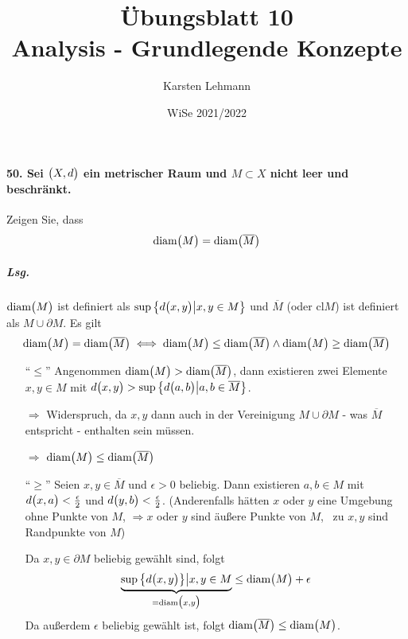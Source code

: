 \documentclass{scrreprt}
\author{Karsten Lehmann}
\date{WiSe 2021/2022}
\title{Übungsblatt 10\\Analysis - Grundlegende Konzepte}
\newcommand\diam{\text{diam}}
\begin{document}
\paragraph{50. Sei $\qty\big(X, d)$ ein metrischer Raum und $M \subset X$
  nicht leer und beschränkt.}
Zeigen Sie, dass
\[
  \diam\qty\big(M) = \diam\qty\big(\overline{M})
\]

\subparagraph{Lsg.} $\diam\qty\big(M)$ ist definiert als
$\sup \qty\big{d\qty\big(x, y) {\big |} x, y \in M}$ und
$\overline{M}$ (oder $\text{cl}M$) ist definiert als $M \cup \partial M$.
Es gilt
\[
  \diam\qty\big(M) = \diam\qty\big(\overline{M}) \iff
  \diam\qty\big(M) \leq \diam\qty\big(\overline{M}) \land
  \diam\qty\big(M) \geq \diam\qty\big(\overline{M})
\]
\begin{itemize}
\item[``$\leq$''] Angenommen $\diam\qty\big(M) > \diam\qty\big(\overline{M})$,
  dann existieren zwei Elemente $x, y \in M$ mit $d\qty\big(x, y) >
  \sup\qty\big{d\qty\big(a, b) {\big |} a, b \in \overline{M}}$.

  $\Rightarrow$ Widerspruch, da $x, y$ dann auch in der Vereinigung
  $M \cup \partial M$ - was $\overline{M}$ entspricht - enthalten sein
  müssen.

  $\Rightarrow$ \underline{$\diam\qty\big(M) \leq \diam\qty\big(\overline{M})$}

\item[``$\geq$''] Seien $x, y \in \overline{M}$ und $\epsilon > 0$ beliebig.
  Dann existieren $a, b \in M$ mit $d\qty\big(x, a) < \frac{\epsilon}{2}$
  und $d\qty\big(y, b) < \frac{\epsilon}{2}$.
  (Anderenfalls hätten $x$ oder $y$ eine Umgebung ohne Punkte von $M$,
  $\Rightarrow x$ oder $y$ sind äußere Punkte von $M$, \Lightning\,
  zu $x, y$ sind Randpunkte von $M$)

  Da $x, y \in \partial M$  beliebig gewählt sind, folgt
  \[
    \underset{= \diam\qty\big(x, y)}
    {\underbrace{\sup\qty\big{d\qty\big(x, y)} {\big |} x, y \in M}}
    \leq \diam\qty\big(M) + \epsilon
  \]
  Da außerdem $\epsilon$ beliebig gewählt ist, folgt
  \underline{$\diam\qty\big(\overline{M}) \leq \diam\qty\big(M)$}.
\end{itemize}
\end{document}
